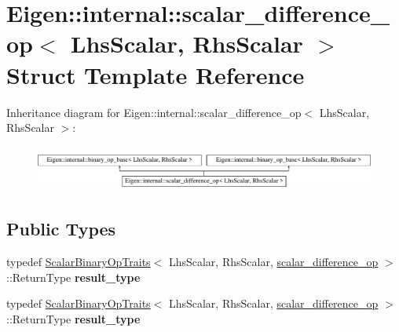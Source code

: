 \hypertarget{struct_eigen_1_1internal_1_1scalar__difference__op}{}\section{Eigen\+:\+:internal\+:\+:scalar\+\_\+difference\+\_\+op$<$ Lhs\+Scalar, Rhs\+Scalar $>$ Struct Template Reference}
\label{struct_eigen_1_1internal_1_1scalar__difference__op}
Inheritance diagram for Eigen\+:\+:internal\+:\+:scalar\+\_\+difference\+\_\+op$<$ Lhs\+Scalar, Rhs\+Scalar $>$\+:\begin{figure}[H]
\begin{center}
\leavevmode
\includegraphics[height=1.493333cm]{struct_eigen_1_1internal_1_1scalar__difference__op}
\end{center}
\end{figure}
\subsection*{Public Types}
\begin{DoxyCompactItemize}
\item 
\mbox{\label{struct_eigen_1_1internal_1_1scalar__difference__op_af12564e6db10e3e97d912c3263feae32}} 
typedef \hyperlink{group___core___module_struct_eigen_1_1_scalar_binary_op_traits}{Scalar\+Binary\+Op\+Traits}$<$ Lhs\+Scalar, Rhs\+Scalar, \hyperlink{struct_eigen_1_1internal_1_1scalar__difference__op}{scalar\+\_\+difference\+\_\+op} $>$\+::Return\+Type {\bfseries result\+\_\+type}
\item 
\mbox{\label{struct_eigen_1_1internal_1_1scalar__difference__op_af12564e6db10e3e97d912c3263feae32}} 
typedef \hyperlink{group___core___module_struct_eigen_1_1_scalar_binary_op_traits}{Scalar\+Binary\+Op\+Traits}$<$ Lhs\+Scalar, Rhs\+Scalar, \hyperlink{struct_eigen_1_1internal_1_1scalar__difference__op}{scalar\+\_\+difference\+\_\+op} $>$\+::Return\+Type {\bfseries result\+\_\+type}
\end{DoxyCompactItemize}
